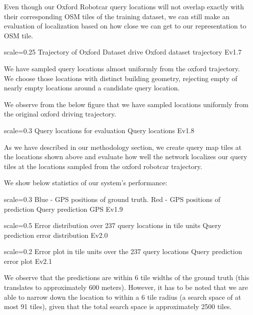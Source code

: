 Even though our Oxford Robotcar query locations will not overlap exactly with their corresponding OSM tiles of the training dataset, we can still make an evaluation of localization based on how close we can get to our representation to OSM tile.

{scale=0.25}%
{Trajectory of Oxford Dataset drive}%
{Oxford dataset trajectory}%
{Ev1.7}

We have sampled query locations almost uniformly from the oxford trajectory. We choose those locations with distinct building geometry, rejecting empty of nearly empty locations around a candidate query location.

\pagebreak
We observe from the below figure that we have sampled locations uniformly from the original oxford driving trajectory. 

{scale=0.3}%
{Query locations for evaluation}%
{Query locations}%
{Ev1.8}

As we have described in our methodology section, we create query map tiles at the locations shown above and evaluate how well the network localizes our query tiles at the locations sampled from the oxford robotcar trajectory. 

We show below statistics of our system's performance:

{scale=0.3}%
{Blue - GPS positions of ground truth. Red - GPS positions of prediction}%
{Query prediction GPS}%
{Ev1.9}

{scale=0.5}%
{Error distribution over 237 query locations in tile units}%
{Query prediction error distribution}%
{Ev2.0}

{scale=0.2}%
{Error plot in tile units over the 237 query locations}%
{Query prediction error plot}%
{Ev2.1}

\pagebreak
We observe that the predictions are within 6 tile widths of the ground truth (this translates to approximately 600 meters). However, it has to be noted that we are able to narrow down the location to within a 6 tile radius (a search space of at most 91 tiles), given that the total search space is approximately 2500 tiles. 


 









